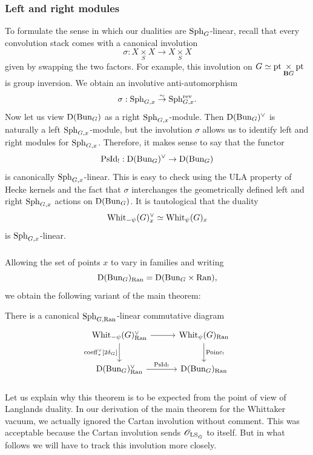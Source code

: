 \subsubsection{Left and right modules} To formulate the sense in which our dualities are $\mathrm{Sph}_G$-linear, recall that every convolution stack comes with a canonical involution
    \[
    \sigma : X \underset{S}{\times} X \to X \underset{S}{\times} X
    \]
given by swapping the two factors. For example, this involution on $G \simeq \mathrm{pt} \underset{\mathbf{B} G}{\times} \mathrm{pt}$ is group inversion. We obtain an involutive anti-automorphism
    \[\sigma : \mathrm{Sph}_{G,x} \overset{\sim}{\rightarrow} \mathrm{Sph}_{G,x}^{\mathrm{rev}}.\]
Now let us view $\mathrm{D}(\mathrm{Bun}_G)$ as a right $\mathrm{Sph}_{G,x}$-module. Then $\mathrm{D}(\mathrm{Bun}_G)^\vee$ is naturally a left $\mathrm{Sph}_{G,x}$-module, but the involution $\sigma$ allows us to identify left and right modules for $\mathrm{Sph}_{G,x}$. Therefore, it makes sense to say that the functor
    \[\mathrm{PsId}_! : \mathrm{D}(\mathrm{Bun}_G)^\vee \to \mathrm{D}(\mathrm{Bun}_G)\]
is canonically $\mathrm{Sph}_{G,x}$-linear. This is easy to check using the ULA property of Hecke kernels and the fact that $\sigma$ interchanges the geometrically defined left and right $\mathrm{Sph}_{G,x}$ actions on $\mathrm{D}(\mathrm{Bun}_G)$. It is tautological that the duality
    \[\mathrm{Whit}_{-\psi}(G)_x^\vee \simeq \mathrm{Whit}_\psi(G)_x\]
is $\mathrm{Sph}_{G,x}$-linear.

\subsubsection{} Allowing the set of points $x$ to vary in families and writing 
    \[\mathrm{D}(\mathrm{Bun}_G)_{\mathrm{Ran}} = \mathrm{D}(\mathrm{Bun}_G \times \mathrm{Ran}),\]
we obtain the following variant of the main theorem:

\begin{theorem}
\label{thm:Ran}
There is a canonical $\mathrm{Sph}_{G,\mathrm{Ran}}$-linear commutative diagram
\[
\begin{tikzcd}[
  column sep={10em,between origins},
  row sep={4em,between origins}
]
    \Whit_{-\psi}(G)_\Ran^\vee \arrow[d, "\coeff_*^\vee {[2 \delta_G]}" left] \arrow[r] & \Whit_\psi(G)_\Ran \arrow[d, "\Poinc_!"] \\
    \DMod(\Bun_G)_\Ran^\vee \arrow[r, "\PsId_!"] & \DMod(\Bun_G)_\Ran
\end{tikzcd}
\]
\end{theorem}

\subsubsection{} Let us explain why this theorem is to be expected from the point of view of Langlands duality. In our derivation of the main theorem for the Whittaker vacuum, we actually ignored the Cartan involution without comment. This was acceptable because the Cartan involution sends $\mathscr{O}_{\mathrm{LS}_{\check{G}}}$ to itself. But in what follows we will have to track this involution more closely.


